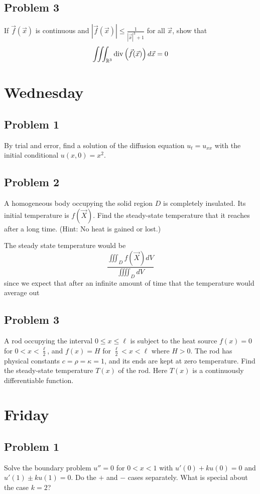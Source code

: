 \documentclass{ben}
\begin{document}
\subsection{Problem 3}
If $\vec{f} (\vec{x})$ is continuous and $|\vec{f} (\vec{x})| \leq \frac{1}{|\vec{x}|^3 + 1}$ for
all $\vec{x}$, show that
\[
    \iiint_{\mathbb{R}^3} \operatorname{div}\left(\vec{f} (\vec{x}) \right) d \vec{x} = 0
\]
\section{Wednesday}
\subsection{Problem 1}
By trial and error, find a solution of the diffusion equation $u_t = u_{xx}$ with the initial
conditional $u(x, 0) = x^2$.
\subsection{Problem 2}
A homogeneous body occupying the solid region $D$ is completely insulated.
Its initial temperature is $f(\vec{X})$. Find the steady-state temperature that it reaches after
a long time. (Hint: No heat is gained or lost.)
\begin{solution}
    The steady state temperature would be
    \[
    \frac{\iiint_{D} f(\vec{X}) dV}{\iiiint_D dV} 
    \]
    since we expect that after an infinite amount of time that the temperature would average out
\end{solution}
\subsection{Problem 3}
A rod occupying the interval $0 \leq x \leq \ell$ is subject to the heat source $f(x) = 0$ for
$0 < x < \frac{\ell}{2}$, and $f(x) = H$ for $\frac{\ell}{2} < x < \ell$ where $H > 0$. The rod has
physical constants $c = \rho = \kappa = 1$, and its ends are kept at zero temperature.
Find the steady-state temperature $T(x)$ of the rod.
Here $T(x)$ is a continuously differentiable function.
\section{Friday}
\subsection{Problem 1}
Solve the boundary problem $u'' = 0$ for $0 < x < 1$ with $u'(0) + ku(0) = 0$ and
$u'(1) \pm ku(1) = 0$. Do the $+$ and $-$ cases separately. What is special about the case $k = 2$?
\end{document}
